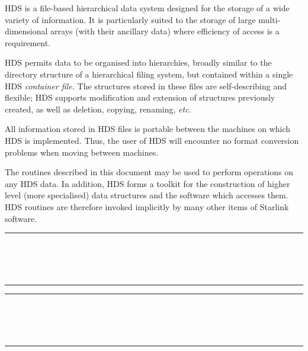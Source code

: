 HDS is a file-based hierarchical data system designed for the storage of a wide
variety of information. It is particularly suited to the storage of large
multi-dimensional arrays (with their ancillary data) where efficiency of access
is a requirement.

HDS permits data to be organised into hierarchies, broadly similar to the
directory structure of a hierarchical filing system, but contained within a
single HDS {\em container file.} The structures stored in these files are
self-describing and flexible; HDS supports modification and extension of
structures previously created, as well as deletion, copying, renaming, {\em
etc.}

All information stored in HDS files is portable between the machines on which
HDS is implemented. Thus, the user of HDS will encounter no format conversion
problems when moving between machines.

The routines described in this document may be used to perform operations on
any HDS data. In addition, HDS forms a toolkit for the construction of higher
level (more specialised) data structures and the software which accesses them.
HDS routines are therefore invoked implicitly by many other items of Starlink
software.

\newpage
\markright{\stardocname}
\null\vspace {5mm}
\begin {center}
\rule{80mm}{0.5mm} \\ [1ex]
{\Large\bf \stardoctitle \\ [2.5ex]
           \stardocversion} \\ [2ex]
\rule{80mm}{0.5mm}
\end{center}

\setlength{\parskip}{0mm}
\tableofcontents
\setlength{\parskip}{\medskipamount}

\newpage
\markright{\stardocname}
\renewcommand{\thepage}{\arabic{page}}
\setcounter{page}{1}

\null\vspace {5mm}
\begin {center}
\rule{80mm}{0.5mm} \\ [1ex]
{\Large\bf \stardoctitle \\ [2.5ex]
           \stardocversion} \\ [2ex]
\rule{80mm}{0.5mm}
\end{center}
\vspace{30mm}

